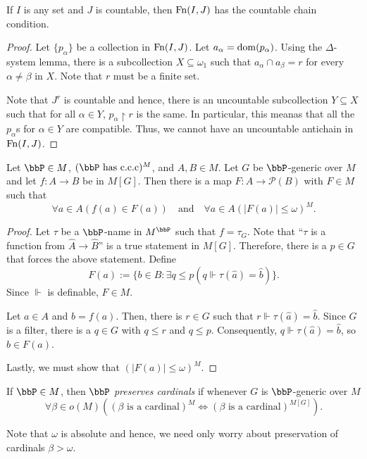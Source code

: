 \begin{lemma}
    If $I$ is any set and $J$ is countable, then $\operatorname{Fn}(I, J)$ has the countable chain condition.
\end{lemma}
\begin{proof}
    Let $\{p_\alpha\}$ be a collection in $\operatorname{Fn}(I, J)$. Let $a_\alpha = \operatorname{dom}(p_\alpha)$. Using the $\Delta$-system lemma, there is a subcollection $X\subseteq\omega_1$ such that $a_\alpha\cap a_\beta = r$ for every $\alpha\ne\beta$ in $X$. Note that $r$ must be a finite set. 

    Note that $J^r$ is countable and hence, there is an uncountable subcollection $Y\subseteq X$ such that for all $\alpha\in Y$, $p_\alpha\upharpoonright r$ is the same. In particular, this meanas that all the $p_\alpha$s for $\alpha\in Y$ are compatible. Thus, we cannot have an uncountable antichain in $\operatorname{Fn}(I, J)$.
\end{proof}


\begin{lemma}
    Let $\bbP\in M$, $(\bbP\text{ has c.c.c})^M$, and $A, B\in M$. Let $G$ be $\bbP$-generic over $M$ and let $f: A\to B$ be in $M[G]$. Then there is a map $F: A\to\mathscr P(B)$ with $F\in M$ such that 
    \begin{equation*}
        \forall a\in A(f(a)\in F(a))\quad\text{and}\quad\forall a\in A\left(|F(a)|\le\omega\right)^M.
    \end{equation*}
\end{lemma}
\begin{proof}
    Let $\tau$ be a $\bbP$-name in $M^{\bbP}$ such that $f = \tau_G$. Note that ``$\tau$ is a function from $\hat A\to\hat B$'' is a true statement in $M[G]$. Therefore, there is a $p\in G$ that forces the above statement. Define 
    \begin{equation*}
        F(a) := \{b\in B\colon\exists q\le p\left(q\Vdash\tau(\hat a) = \hat b\right)\}.
    \end{equation*}
    Since $\Vdash$ is definable, $F\in M$.

    Let $a\in A$ and $b = f(a)$. Then, there is $r\in G$ such that $r\Vdash \tau(\hat a) = \hat b$. Since $G$ is a filter, there is a $q\in G$ with $q\le r$ and $q\le p$. Consequently, $q\Vdash\tau(\hat a) = \hat b$, so $b\in F(a)$.

    Lastly, we must show that $\left(|F(a)|\le\omega\right)^M$.
\end{proof}

\begin{definition}
    If $\bbP\in M$, then $\bbP$ \emph{preserves cardinals} if whenever $G$ is $\bbP$-generic over $M$ 
    \begin{equation*}
        \forall\beta\in o(M)\left((\beta\text{ is a cardinal})^M\iff(\beta\text{ is a cardinal})^{M[G]}\right).
    \end{equation*}

    Note that $\omega$ is absolute and hence, we need only worry about preservation of cardinals $\beta > \omega$.
\end{definition}

